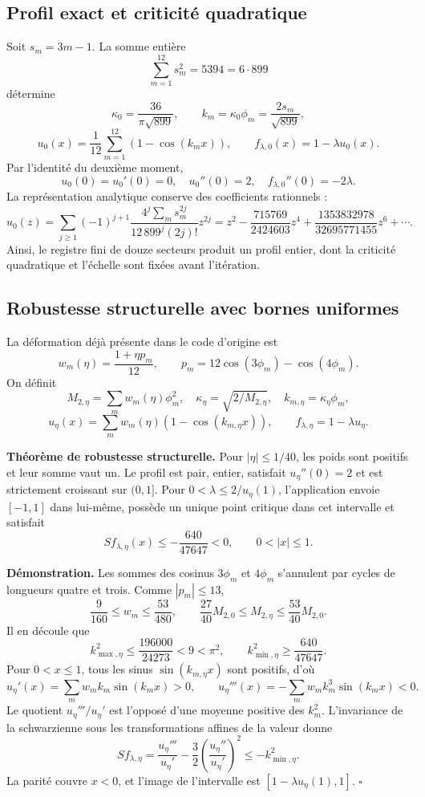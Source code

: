 \subsection{Profil exact et criticité quadratique}
\label{hmtfg:desarrollo:2}

Soit \(s_m=3m-1\). La somme entière
\[
\sum_{m=1}^{12}s_m^2=5394=6\cdot899
\]
détermine
\[
\kappa_0=\frac{36}{\pi\sqrt{899}},\qquad
k_m=\kappa_0\phi_m=\frac{2s_m}{\sqrt{899}},
\]
\[
u_0(x)=\frac1{12}\sum_{m=1}^{12}(1-\cos(k_mx)),\qquad
f_{\lambda,0}(x)=1-\lambda u_0(x).
\]
Par l’identité du deuxième moment,
\[
u_0(0)=u_0'(0)=0,\quad u_0''(0)=2,\quad
f_{\lambda,0}''(0)=-2\lambda.
\]
La représentation analytique conserve des coefficients rationnels :
\[
u_0(z)=\sum_{j\ge1}(-1)^{j+1}
\frac{4^j\sum_m s_m^{2j}}{12\,899^j(2j)!}z^{2j}
=z^2-\frac{715769}{2424603}z^4
+\frac{1353832978}{32695771455}z^6+\cdots.
\]
Ainsi, le registre fini de douze secteurs produit un profil entier, dont la criticité quadratique et l’échelle sont fixées avant l’itération.


\subsection{Robustesse structurelle avec bornes uniformes}
\label{hmtfg:desarrollo:3}

La déformation déjà présente dans le code d’origine est
\[
w_m(\eta)=\frac{1+\eta p_m}{12},\qquad
p_m=12\cos(3\phi_m)-\cos(4\phi_m).
\]
On définit
\[
M_{2,\eta}=\sum_mw_m(\eta)\phi_m^2,\quad
\kappa_\eta=\sqrt{2/M_{2,\eta}},\quad k_{m,\eta}=\kappa_\eta\phi_m,
\]
\[
u_\eta(x)=\sum_mw_m(\eta)(1-\cos(k_{m,\eta}x)),\qquad
f_{\lambda,\eta}=1-\lambda u_\eta.
\]

\textbf{Théorème de robustesse structurelle.} Pour \(|\eta|\le1/40\), les poids sont positifs et leur somme vaut un. Le profil est pair, entier, satisfait \(u_\eta''(0)=2\) et est strictement croissant sur \((0,1]\). Pour \(0<\lambda\le2/u_\eta(1)\), l’application envoie \([-1,1]\) dans lui-même, possède un unique point critique dans cet intervalle et satisfait
\[
S f_{\lambda,\eta}(x)\le-\frac{640}{47647}<0,\qquad0<|x|\le1.
\]

\textbf{Démonstration.} Les sommes des cosinus \(3\phi_m\) et \(4\phi_m\) s’annulent par cycles de longueurs quatre et trois. Comme \(|p_m|\le13\),
\[
\frac9{160}\le w_m\le\frac{53}{480},\qquad
\frac{27}{40}M_{2,0}\le M_{2,\eta}\le\frac{53}{40}M_{2,0}.
\]
Il en découle que
\[
k_{\max,\eta}^2\le\frac{196000}{24273}<9<\pi^2,\qquad
k_{\min,\eta}^2\ge\frac{640}{47647}.
\]
Pour \(0<x\le1\), tous les sinus \(\sin(k_{m,\eta}x)\) sont positifs, d’où
\[
u_\eta'(x)=\sum_mw_mk_m\sin(k_mx)>0,\qquad
u_\eta'''(x)=-\sum_mw_mk_m^3\sin(k_mx)<0.
\]
Le quotient \(u_\eta'''/u_\eta'\) est l’opposé d’une moyenne positive des \(k_m^2\). L’invariance de la schwarzienne sous les transformations affines de la valeur donne
\[
S f_{\lambda,\eta}
=\frac{u_\eta'''}{u_\eta'}-\frac32
\left(\frac{u_\eta''}{u_\eta'}\right)^2
\le-k_{\min,\eta}^2.
\]
La parité couvre \(x<0\), et l’image de l’intervalle est
\([1-\lambda u_\eta(1),1]\). \(\square\)

